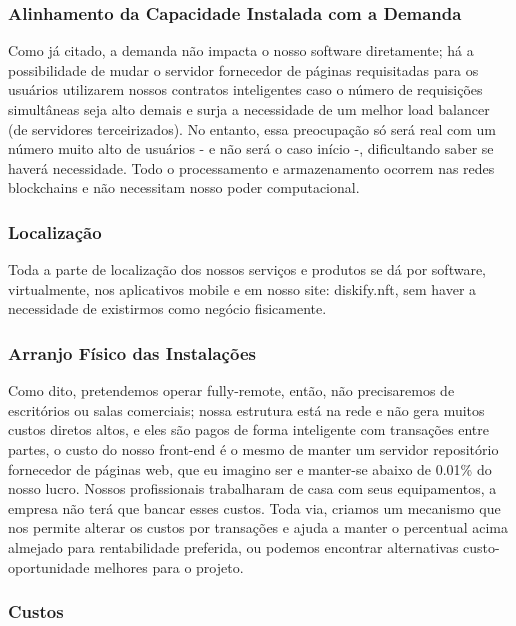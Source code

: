 \documentclass[onecolumn,12pt]{asme2ej}
\begin{document}
\subsubsection{Alinhamento da Capacidade Instalada com a Demanda} 

Como já citado, a demanda não impacta o nosso software diretamente; há a possibilidade de mudar o servidor fornecedor de páginas requisitadas para os usuários utilizarem nossos contratos inteligentes caso o número de requisições simultâneas seja alto demais e surja a necessidade de um melhor load balancer (de servidores terceirizados). No entanto, essa preocupação só será real com um número muito alto de usuários - e não será o caso início -, dificultando saber se haverá necessidade. Todo o processamento e armazenamento ocorrem nas redes blockchains e não necessitam nosso poder computacional.

\subsubsection{Localização}

Toda a parte de localização dos nossos serviços e produtos se dá por software, virtualmente, nos aplicativos mobile e em nosso site: diskify.nft, sem haver a necessidade de existirmos como negócio fisicamente.

\subsubsection{Arranjo Físico das Instalações} 

Como dito, pretendemos operar fully-remote, então, não precisaremos de escritórios ou salas comerciais; nossa estrutura está na rede e não gera muitos custos diretos altos, e eles são pagos de forma inteligente com transações entre partes, o custo do nosso front-end é o mesmo de manter um servidor repositório fornecedor de páginas web, que eu imagino ser e manter-se abaixo de 0.01\% do nosso lucro. Nossos profissionais trabalharam de casa com seus equipamentos, a empresa não terá que bancar esses custos. Toda via, criamos um mecanismo que nos permite alterar os custos por transações e ajuda a manter o percentual acima almejado para rentabilidade preferida, ou podemos encontrar alternativas custo-oportunidade melhores para o projeto.

\subsubsection{Custos}
\end{document}
